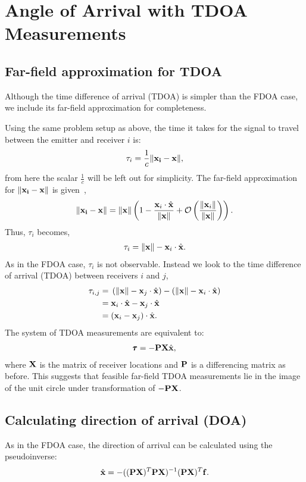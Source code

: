 \section{Angle of Arrival with TDOA Measurements}
\label{s:TDOA}
\subsection{Far-field approximation for TDOA}
Although the time difference of arrival (TDOA) is simpler than the FDOA case, we include its far-field approximation for completeness.

Using the same problem setup as above, the time it takes for the signal to travel between the emitter and receiver $i$ is:
\begin{align*}
  \tau_{i} = \frac{1}{c}\|\mathbf{x_i}-\mathbf{x}\|,
\end{align*}
from here the scalar $\frac{1}{c}$ will be left out for simplicity.
The far-field approximation for $\|\mathbf{x_i}-\mathbf{x}\|$ is given~\cite{Cheney2009},
\begin{align*}
  \|\mathbf{x_i}-\mathbf{x}\|=\|\mathbf{x}\|\left(1-\frac{\mathbf{x}_i\cdot\hat{\mathbf{x}}}{\|\mathbf{x}\|}+\mathcal{O}\left( \frac{\|\mathbf{x}_i\|}{\|\mathbf{x}\|}\right) \right).
\end{align*}
Thus, $\tau_{i}$ becomes,
\begin{align*}
  \tau_{i} = \|\mathbf{x}\| - \mathbf{x}_i\cdot\hat{\mathbf{x}}.
\end{align*}
As in the FDOA case, $\tau_i$ is not observable. Instead we look to the time difference of arrival (TDOA) between receivers $i$ and $j$,
\begin{align*}
  \tau_{i,j} =& \; \left(\|\mathbf{x}\| - \mathbf{x}_j\cdot\hat{\mathbf{x}}\right) - \left(\|\mathbf{x}\| - \mathbf{x}_i\cdot\hat{\mathbf{x}}\right) \\
            =& \; \mathbf{x}_i\cdot\hat{\mathbf{x}} - \mathbf{x}_j\cdot\hat{\mathbf{x}} \\
            =& \; (\mathbf{x}_i-\mathbf{x}_j)\cdot\hat{\mathbf{x}}.
\end{align*}
The system of TDOA measurements are equivalent to:
\begin{align}
  \pmb{\tau} = -\mathbf{PX}\hat{\mathbf{x}},
\end{align}
where $\mathbf{X}$ is the matrix of receiver locations and $\mathbf{P}$ is a differencing matrix as before. This suggests that feasible far-field TDOA measurements lie in the image of the unit circle under transformation of $-\mathbf{PX}$.

\subsection{Calculating direction of arrival (DOA)}
As in the FDOA case, the direction of arrival can be calculated using the pseudoinverse:
\begin{align}
    \label{eq:doa_t}
  \hat{\mathbf{x}} = -((\mathbf{PX})^T\mathbf{PX})^{-1}(\mathbf{PX})^T\mathbf{f}.
\end{align}
